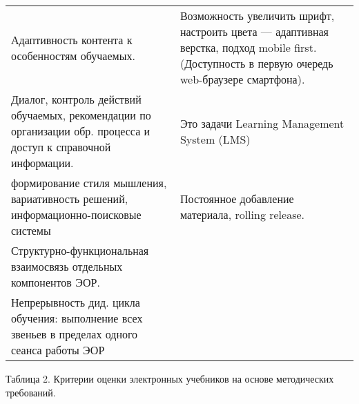 \documentclass[
]{article}
\begin{document}
\begin{longtable}[]{@{}
  >{\raggedright\arraybackslash}p{}
  >{\raggedright\arraybackslash}p{}@{}}
Адаптивность контента к особенностям обучаемых. & Возможность увеличить
шрифт, настроить цвета --- адаптивная верстка, подход mobile first.
(Доступность в первую очередь web-браузере смартфона). \\
Диалог, контроль действий обучаемых, рекомендации по организации обр.
процесса и доступ к справочной информации. & Это задачи Learning
Management System (LMS) \\
формирование стиля мышления, вариативность решений,
информационно-поисковые системы & Постоянное добавление материала,
rolling release. \\
Структурно-функциональная взаимосвязь отдельных компонентов ЭОР. & \\
Непрерывность дид. цикла обучения: выполнение всех звеньев в пределах
одного сеанса работы ЭОР & \\
\bottomrule
\end{longtable}

Таблица 2. Критерии оценки электронных учебников на основе методических
требований.
\end{document}
